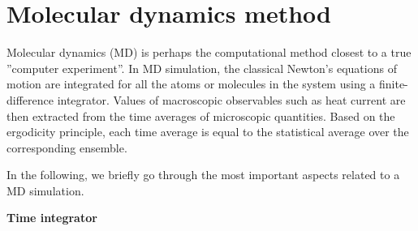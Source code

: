 \section{Molecular dynamics method}

Molecular dynamics (MD) is perhaps the computational method closest to a true ''computer experiment''. In MD simulation, the classical Newton's equations of motion are integrated for all the atoms or molecules in the system using a finite-difference integrator. Values of macroscopic observables such as heat current are then extracted from the time averages of microscopic quantities. Based on the ergodicity principle, each time average is equal to the statistical average over the corresponding ensemble. 


In the following, we briefly go through the most important aspects related to a MD simulation.


\textbf{Time integrator}

